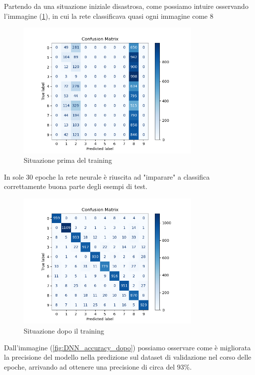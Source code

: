 Partendo da una situazione iniziale disastrosa, come possiamo intuire osservando 
l'immagine (\ref{fig:DNN_con_matrix_prima}),  in cui la rete classificava 
quasi ogni immagine come $8$

\begin{figure}[H]
    \centering
    \includegraphics[width=0.80\textwidth]{Immagini/Grafici/confusion_matrix_prima.png}
    \caption{Situazione prima del training}
    \label{fig:DNN_con_matrix_prima}
\end{figure}

In sole $30$ epoche la rete neurale è riuscita ad "imparare" a classifica correttamente 
buona parte degli esempi di test.

\begin{figure}[H]
    \centering
    \includegraphics[width=0.80\textwidth]{Immagini/Grafici/confusion_matrix_dopo.png}
    \caption{Situazione dopo il training}
    \label{fig:DNN_con_matrix_dopo}
\end{figure}

Dall'immagine (\ref{fig:DNN_accuracy_dopo}) possiamo osservare come è migliorata la 
precisione del modello nella predizione sul dataset di validazione nel corso delle 
epoche, arrivando ad ottenere una precisione di circa del $93\%$. 


